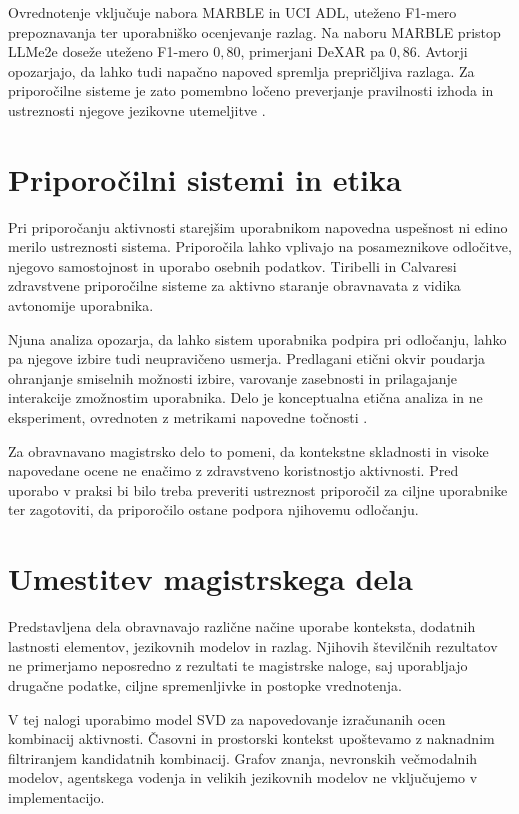 \documentclass[a4paper,twoside,openright,12pt,slovene]{book}
\begin{document}
Ovrednotenje vključuje nabora MARBLE in UCI ADL,
uteženo F1-mero prepoznavanja ter uporabniško
ocenjevanje razlag. Na naboru MARBLE pristop
LLMe2e doseže uteženo F1-mero $0{,}80$,
primerjani DeXAR pa $0{,}86$.
Avtorji opozarjajo, da lahko tudi napačno napoved
spremlja prepričljiva razlaga.
Za priporočilne sisteme je zato pomembno ločeno
preverjanje pravilnosti izhoda in ustreznosti
njegove jezikovne utemeljitve
\cite{fiori2025activity}.


\section{Priporočilni sistemi in etika}
\label{sec:sota_ethics}

Pri priporočanju aktivnosti starejšim uporabnikom
napovedna uspešnost ni edino merilo ustreznosti
sistema. Priporočila lahko vplivajo na posameznikove
odločitve, njegovo samostojnost in uporabo osebnih
podatkov. Tiribelli in Calvaresi
\cite{tiribelli2024autonomy} zdravstvene priporočilne
sisteme za aktivno staranje obravnavata z vidika
avtonomije uporabnika.

Njuna analiza opozarja, da lahko sistem uporabnika
podpira pri odločanju, lahko pa njegove izbire
tudi neupravičeno usmerja. Predlagani etični okvir
poudarja ohranjanje smiselnih možnosti izbire,
varovanje zasebnosti in prilagajanje interakcije
zmožnostim uporabnika. Delo je konceptualna etična
analiza in ne eksperiment, ovrednoten z metrikami
napovedne točnosti \cite{tiribelli2024autonomy}.

Za obravnavano magistrsko delo to pomeni, da
kontekstne skladnosti in visoke napovedane ocene
ne enačimo z zdravstveno koristnostjo aktivnosti.
Pred uporabo v praksi bi bilo treba preveriti
ustreznost priporočil za ciljne uporabnike ter
zagotoviti, da priporočilo ostane podpora
njihovemu odločanju.


\section{Umestitev magistrskega dela}
\label{sec:sota_positioning}

Predstavljena dela obravnavajo različne načine uporabe
konteksta, dodatnih lastnosti elementov, jezikovnih
modelov in razlag. Njihovih številčnih rezultatov
ne primerjamo neposredno z rezultati te magistrske
naloge, saj uporabljajo drugačne podatke, ciljne
spremenljivke in postopke vrednotenja.

V tej nalogi uporabimo model SVD za napovedovanje
izračunanih ocen kombinacij aktivnosti. Časovni
in prostorski kontekst upoštevamo z naknadnim
filtriranjem kandidatnih kombinacij. Grafov znanja,
nevronskih večmodalnih modelov, agentskega vodenja
in velikih jezikovnih modelov ne vključujemo
v implementacijo.
\end{document}
